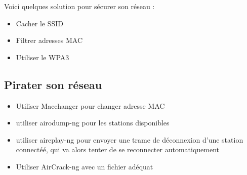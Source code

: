 \documentclass[12pt, a4paper]{article}
\begin{document}
Voici quelques solution pour sécurer son réseau : \\
\begin{itemize}
    \item Cacher le SSID
    \item Filtrer adresses MAC
    \item Utiliser le WPA3
\end{itemize}

\subsection{Pirater son réseau}
\begin{itemize}
    \item Utiliser Macchanger pour changer adresse MAC
    \item utiliser airodump-ng pour les stations disponibles
    \item utiliser aireplay-ng pour envoyer une trame de déconnexion d'une station connectéé, qui va alors tenter de se reconnecter automatiquement
    \item Utiliser AirCrack-ng avec un fichier adéquat
\end{itemize}
\end{document}
